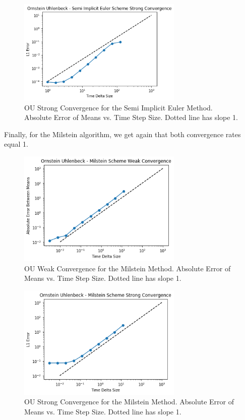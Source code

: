 \documentclass[notitlepage,pra,10pt,aps]{revtex4-2}
\begin{document}
  \begin{figure}[H]
    \centering
      \includegraphics[width=0.7\textwidth]{ou_strong_semi.png}
    \caption{OU Strong Convergence for the Semi Implicit Euler Method. Absolute Error of Means vs. Time Step Size. Dotted line has slope 1.}
  \end{figure}

  Finally, for the Milstein algorithm, we get again that both convergence rates equal 1.

  \begin{figure}[H]
    \centering
      \includegraphics[width=0.7\textwidth]{ou_weak_milstein.png}
    \caption{OU Weak Convergence for the Milstein Method. Absolute Error of Means vs. Time Step Size. Dotted line has slope 1.}
  \end{figure}

  \begin{figure}[H]
    \centering
      \includegraphics[width=0.7\textwidth]{ou_strong_milstein.png}
    \caption{OU Strong Convergence for the Milstein Method. Absolute Error of Means vs. Time Step Size. Dotted line has slope 1.}
  \end{figure}
\end{document}
